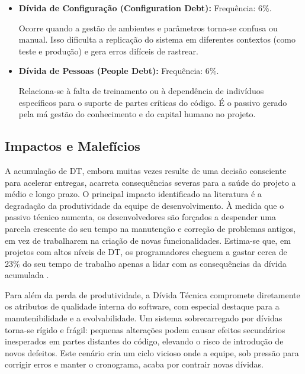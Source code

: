 \documentclass[12pt,openright,oneside,a4paper,brazil]{abntex2}
\begin{document}
\begin{itemize}
    A Dívida de Build foca na ineficiência do processo de construção do software. Entre os pontos críticos dessa dívida estão a lentidão, dependência de processos manuais que poderiam ser automatizados, execução de dependências mal definidas ou a inclusão de código que não agrega valor.

    \item \textbf{Dívida de Configuração (Configuration Debt):} Frequência: 6\%.

    Ocorre quando a gestão de ambientes e parâmetros torna-se confusa ou manual. Isso dificulta a replicação do sistema em diferentes contextos (como teste e produção) e gera erros difíceis de rastrear.

    \item \textbf{Dívida de Pessoas (People Debt):} Frequência: 6\%.

    Relaciona-se à falta de treinamento ou à dependência de indivíduos específicos para o suporte de partes críticas do código. É o passivo gerado pela má gestão do conhecimento e do capital humano no projeto.
\end{itemize}

\subsection{Impactos e Malefícios}

A acumulação de DT, embora muitas vezes resulte de uma decisão consciente para acelerar entregas, acarreta consequências severas para a saúde do projeto a médio e longo prazo. O principal impacto identificado na literatura é a degradação da produtividade da equipe de desenvolvimento. À medida que o passivo técnico aumenta, os desenvolvedores são forçados a despender uma parcela crescente do seu tempo na manutenção e correção de problemas antigos, em vez de trabalharem na criação de novas funcionalidades. Estima-se que, em projetos com altos níveis de DT, os programadores cheguem a gastar cerca de 23\% do seu tempo de trabalho apenas a lidar com as consequências da dívida acumulada \cite{BIAZOTTO2024107375}.

Para além da perda de produtividade, a Dívida Técnica compromete diretamente os atributos de qualidade interna do software, com especial destaque para a manutenibilidade e a evolvabilidade. Um sistema sobrecarregado por dívidas torna-se rígido e frágil: pequenas alterações podem causar efeitos secundários inesperados em partes distantes do código, elevando o risco de introdução de novos defeitos. Este cenário cria um ciclo vicioso onde a equipe, sob pressão para corrigir erros e manter o cronograma, acaba por contrair novas dívidas.
\end{document}
